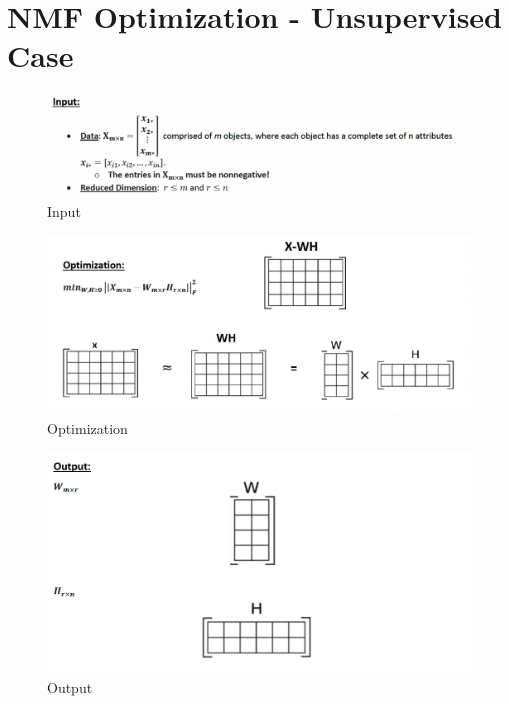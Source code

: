 \documentclass[11pt]{elegantbook}
\begin{document}
\section{NMF Optimization - Unsupervised Case}
\begin{center}\begin{figure}[htbp]
    \centering
    \includegraphics[scale=0.45]{NMF input.png}
    \caption{Input}
    \label{}
\end{figure}\end{center}
\begin{center}\begin{figure}[htbp]
    \centering
    \includegraphics[scale=0.45]{NMF opt.png}
    \caption{Optimization}
    \label{}
\end{figure}\end{center}
\begin{center}\begin{figure}[htbp]
    \centering
    \includegraphics[scale=0.45]{NMF output.png}
    \caption{Output}
    \label{}
\end{figure}\end{center}
\end{document}
